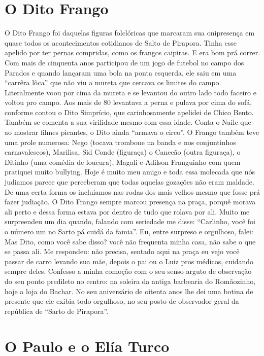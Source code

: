 \documentclass[12pt,brazil,]{book}
\begin{document}
\section{O Dito Frango}\label{o-dito-frango}

O Dito Frango foi daquelas figuras folclóricas que marcaram sua
onipresença em quase todos os acontecimentos cotidianos de Salto de
Pirapora. Tinha esse apelido por ter pernas compridas, como os frangos
caipiras. E era bom prá correr. Com mais de cinquenta anos participou de
um jogo de futebol no campo dos Parados e quando lançaram uma bola na
ponta esquerda, ele saiu em uma ``carrêra lôca'' que não viu a mureta
que cercava os limites do campo. Literalmente voou por cima da mureta e
se levantou do outro lado todo faceiro e voltou pro campo. Aos mais de
80 levantava a perna e pulava por cima do sofá, conforme contou o Dito
Simprício, que carinhosamente apelidei de Chico Bento. Também se comenta
a sua virilidade mesmo com essa idade. Conta o Naile que ao mostrar
filmes picantes, o Dito ainda ``armava o circo''. O Frango também teve
uma prole numerosa: Nego (tocava trombone na banda e nos conjuntinhos
carnavalescos), Marilisa, Sid Conde (figuraça) o Canecão (outra
figuraça), o Ditinho (uma comédia de loucura), Magali e Adilson
Franguinho com quem pratiquei muito bullying. Hoje é muito meu amigo e
toda essa molecada que nós judiamos parece que perceberam que todas
aquelas gozações não eram maldade. De uma certa forma os incluíamos nas
rodas dos mais velhos mesmo que fosse prá fazer judiação. O Dito Frango
sempre marcou presença na praça, porquê morava ali perto e dessa forma
estava por dentro de tudo que rolava por ali. Muito me surpreendeu um
dia quando, falando com seriedade me disse: ``Carlinho, você foi o
número um no Sarto pá cuidá da famia''. Eu, entre surpreso e orgulhoso,
falei: Mas Dito, como você sabe disso? você não frequenta minha casa,
não sabe o que se passa ali. Me respondeu: não precisa, sentado aqui na
praça eu vejo você passar de carro levando sua mãe, depois o pai ou o
Luiz pros médicos, cuidando sempre deles. Confesso a minha comoção com o
seu senso arguto de observação do seu ponto predileto no centro: na
soleira da antiga barbearia do Romãozinho, hoje a loja do Bachar. No seu
aniversário de oitenta anos lhe dei uma botina de presente que ele
exibia todo orgulhoso, no seu posto de observador geral da república de
``Sarto de Pirapora''.

\section{O Paulo e o Elía Turco}\label{o-paulo-e-o-eluxeda-turco}
\end{document}
